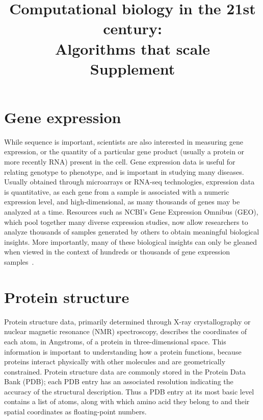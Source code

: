 \documentclass[12pt]{article}
\title{Computational biology in the 21st century:\\Algorithms that scale\\Supplement}
\date{}
\begin{document}
        
\maketitle

\section{Gene expression}
        
While sequence is important, scientists are also interested in measuring gene expression, or the quantity of
a particular gene product (usually a protein or more recently RNA) present in the cell.
Gene expression data is useful for relating genotype to phenotype, and is 
important in studying many diseases.
Usually obtained through microarrays or RNA-seq technologies, expression data is
quantitative, as each gene from a sample is associated with a numeric expression
level, and high-dimensional, as many thousands of genes may be analyzed at a
time.
Resources such as NCBI’s Gene Expression Omnibus (GEO), which pool 
together many diverse expression studies, now allow researchers to analyze 
thousands of samples generated by others to obtain meaningful biological 
insights. 
More importantly, many of these biological insights can only be gleaned when 
viewed in the context of hundreds or thousands of gene expression samples~\cite{berger2013computational}.     

\section{Protein structure}   
        
Protein structure data, primarily determined through X-ray crystallography or
nuclear magnetic resonance (NMR) spectroscopy, describes the coordinates of 
each atom, in Angstroms, of a protein in three-dimensional space.
This information is important to understanding how a protein functions, because
proteins interact physically with other molecules and are geometrically constrained.
Protein structure data are commonly stored in the Protein Data Bank (PDB); 
each PDB entry has an associated resolution indicating the accuracy of the
structural description.
Thus a PDB entry at its most basic level contains a list of atoms, along with
which amino acid they belong to and their spatial coordinates as floating-point
numbers.        
        
\end{document}

